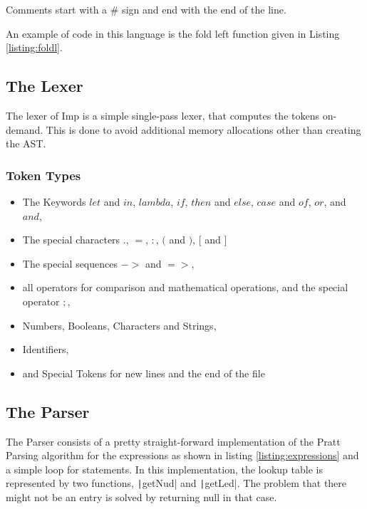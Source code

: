 \documentclass[12pt]{article}
\begin{document}
Comments start with a $\#$ sign and end with the end of the line.

An example of code in this language is the fold left function
given in Listing \ref{listing:foldl}.

\subsection{The Lexer}
The lexer of Imp is a simple single-pass lexer, that computes
the tokens on-demand. This is done to avoid additional memory
allocations other than creating the AST.

\subsubsection{Token Types}
\begin{itemize}
      \item The Keywords $let$ and $in$, $lambda$, $if$, $then$ and $else$,
            $case$ and $of$, $or$, and $and$,
      \item The special characters $.$, $=$, $:$, $($ and $)$, $[$ and $]$
      \item The special sequences $->$ and $=>$,
      \item all operators for comparison and mathematical operations,
            and the special operator $;$,
      \item Numbers, Booleans, Characters and Strings,
      \item Identifiers,
      \item and Special Tokens for new lines and the end of the file
\end{itemize}

\subsection{The Parser}


The Parser consists of a pretty straight-forward implementation of the Pratt Parsing algorithm
for the expressions as shown in listing \ref{listing:expressions} and a simple loop for statements.
In this implementation, the lookup table is represented by two functions,
\texttt|getNud| and \texttt|getLed|.
The problem that there might not be an entry is solved by returning null
in that case.
\end{document}
